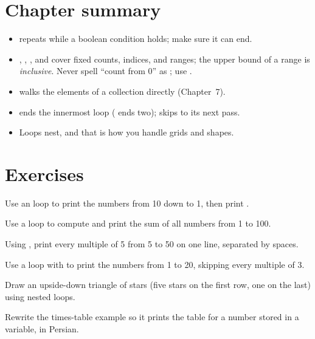 \section{Chapter summary}

\begin{itemize}[leftmargin=1.4em]
  \item {} repeats while a boolean condition holds; make sure it
        can end.
  \item {}, , , and
         cover fixed counts, indices, and ranges; the
        upper bound of a range is \emph{inclusive}. Never spell ``count from 0''
        as ; use .
  \item {} walks the elements of a collection directly
        (Chapter~7).
  \item {} ends the innermost loop ( ends two);
         skips to its next pass.
  \item Loops nest, and that is how you handle grids and shapes.
\end{itemize}

\section{Exercises}

\exercise Use an  loop to print the numbers from 10 down to 1, then
print .

\exercise Use a  loop to compute and print the sum of all numbers
from 1 to 100.

\exercise Using , print every multiple of 5 from 5 to 50 on
one line, separated by spaces.

\exercise Use a loop with  to print the numbers from 1 to 20,
skipping every multiple of 3.

\exercise Draw an upside-down triangle of stars (five stars on the first row, one
on the last) using nested loops.

\exercise Rewrite the times-table example so it prints the table for a number
stored in a variable, in Persian.
